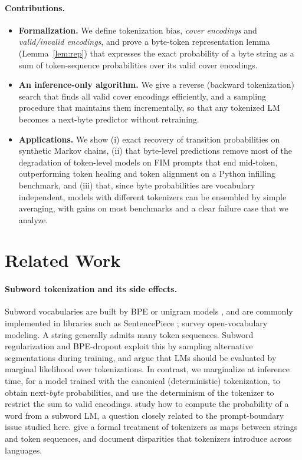 \documentclass{article} %
\begin{document}
\paragraph{Contributions.}
\begin{itemize}
\item \textbf{Formalization.} We define tokenization bias, \emph{cover encodings} and \emph{valid/invalid encodings}, and prove a byte-token representation lemma (Lemma~\ref{lem:rep}) that expresses the exact probability of a byte string as a sum of token-sequence probabilities over its valid cover encodings.
\item \textbf{An inference-only algorithm.} We give a reverse (backward tokenization) search that finds all valid cover encodings efficiently, and a sampling procedure that maintains them incrementally, so that any tokenized LM becomes a next-byte predictor without retraining.
\item \textbf{Applications.} We show (i) exact recovery of transition probabilities on synthetic Markov chains, (ii) that byte-level predictions remove most of the degradation of token-level models on FIM prompts that end mid-token, outperforming token healing and token alignment on a Python infilling benchmark, and (iii) that, since byte probabilities are vocabulary independent, models with different tokenizers can be ensembled by simple averaging, with gains on most benchmarks and a clear failure case that we analyze.
\end{itemize}

\section{Related Work}
\label{sec:related_work}
\paragraph{Subword tokenization and its side effects.}
Subword vocabularies are built by BPE \citep{gage1994bpe,sennrich2016bpe} or unigram models \citep{kudo2018subword}, and are commonly implemented in libraries such as SentencePiece \citep{kudo2018sentencepiece}; \citet{mielke2021between} survey open-vocabulary modeling. A string generally admits many token sequences. Subword regularization \citep{kudo2018subword} and BPE-dropout \citep{provilkov2020bpedropout} exploit this by sampling alternative segmentations during training, and \citet{cao2021marginal} argue that LMs should be evaluated by marginal likelihood over tokenizations. In contrast, we marginalize at inference time, for a model trained with the canonical (deterministic) tokenization, to obtain next-\emph{byte} probabilities, and use the determinism of the tokenizer to restrict the sum to valid encodings. \citet{pimentel2024word} study how to compute the probability of a word from a subword LM, a question closely related to the prompt-boundary issue studied here. \citet{gastaldi2024foundations} give a formal treatment of tokenizers as maps between strings and token sequences, and \citet{petrov2023unfairness} document disparities that tokenizers introduce across languages.
\end{document}
